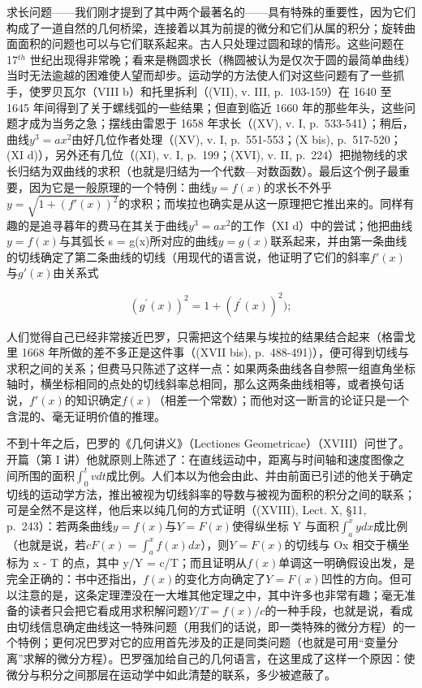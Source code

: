 求长问题——我们刚才提到了其中两个最著名的——具有特殊的重要性，因为它们构成了一道自然的几何桥梁，连接着以其为前提的微分和它们从属的积分；旋转曲面面积的问题也可以与它们联系起来。古人只处理过圆和球的情形。这些问题在 17\(^{th}\) 世纪出现得非常晚；看来是椭圆求长（椭圆被认为是仅次于圆的最简单曲线）当时无法逾越的困难使人望而却步。运动学的方法使人们对这些问题有了一些抓手，使罗贝瓦尔（VIII b）和托里拆利（(VII), v. III, p.~103-159）在 1640 至 1645 年间得到了关于螺线弧的一些结果；但直到临近 1660 年的那些年头，这些问题才成为当务之急；摆线由雷恩于 1658 年求长（(XV), v. I, p.~533-541）；稍后，曲线\(y^{3} = ax^{2}\)由好几位作者处理（(XV), v. I, p.~551-553；(X bis), p.~517-520；(XI d)），另外还有几位（(XI), v. I, p.~199；(XVI), v. II, p.~224）把抛物线的求长归结为双曲线的求积（也就是归结为一个代数—对数函数）。最后这个例子最重要，因为它是一般原理的一个特例：曲线\(y = f(x)\)的求长不外乎\(y = \sqrt{1 + (f'(x))^2}\)的求积；而埃拉也确实是从这一原理把它推出来的。同样有趣的是追寻暮年的费马在其关于曲线\(y^3 = ax^2\)的工作（XI d）中的尝试；他把曲线\(y = f(x)\)与其弧长 s = g(x)所对应的曲线\(y = g(x)\)联系起来，并由第一条曲线的切线确定了第二条曲线的切线（用现代的语言说，他证明了它们的斜率\(f'(x)\)与\(g'(x)\)由关系式

\[
\left(g ^ {\prime} (x)\right) ^ {2} = 1 + \left(f ^ {\prime} (x)\right) ^ {2});
\]

人们觉得自己已经非常接近巴罗，只需把这个结果与埃拉的结果结合起来（格雷戈里 1668 年所做的差不多正是这件事（(XVII bis), p.~488-491)），便可得到切线与求积之间的关系；但费马只陈述了这样一点：如果两条曲线各自参照一组直角坐标轴时，横坐标相同的点处的切线斜率总相同，那么这两条曲线相等，或者换句话说，\(f'(x)\)的知识确定\(f(x)\)（相差一个常数）；而他对这一断言的论证只是一个含混的、毫无证明价值的推理。

不到十年之后，巴罗的《几何讲义》（Lectiones Geometricae）（XVIII）问世了。开篇（第 I 讲）他就原则上陈述了：在直线运动中，距离与时间轴和速度图像之间所围的面积\(\int_{0}^{t} v dt\)成比例。人们本以为他会由此、并由前面已引述的他关于确定切线的运动学方法，推出被视为切线斜率的导数与被视为面积的积分之间的联系；可是全然不是这样，他后来以纯几何的方式证明（(XVIII), Lect. X, §11, p.~243）：若两条曲线\(y = f(x)\)与\(Y = F(x)\)使得纵坐标 Y 与面积\(\int_{a}^{x} y dx\)成比例（也就是说，若\(cF(x) = \int_{a}^{x} f(x) dx\)），则\(Y = F(x)\)的切线与 Ox 相交于横坐标为 x - T 的点，其中 y/Y = c/T；而且证明从\(f(x)\)单调这一明确假设出发，是完全正确的：书中还指出，\(f(x)\)的变化方向确定了\(Y = F(x)\)凹性的方向。但可以注意的是，这条定理湮没在一大堆其他定理之中，其中许多也非常有趣；毫无准备的读者只会把它看成用求积解问题\(Y/T = f(x)/c\)的一种手段，也就是说，看成由切线信息确定曲线这一特殊问题（用我们的话说，即一类特殊的微分方程）的一个特例；更何况巴罗对它的应用首先涉及的正是同类问题（也就是可用“变量分离”求解的微分方程）。巴罗强加给自己的几何语言，在这里成了这样一个原因：使微分与积分之间那层在运动学中如此清楚的联系，多少被遮蔽了。

